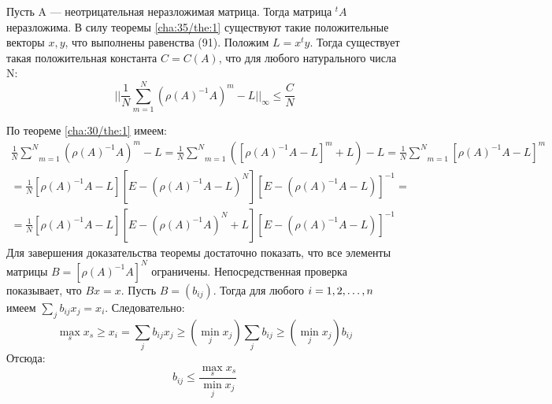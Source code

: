 \begin{theorem}[]\label{cha:36/the:1}
	Пусть A — неотрицательная неразложимая матрица. Тогда матрица $^tA$ неразложима. В силу теоремы \ref{cha:35/the:1} существуют такие положительные векторы $x,y$, что выполнены равенства (91). Положим $L = x^ty$. Тогда существует такая положительная константа $C = C(A)$, что для любого натурального числа N:
	$$\Big| \Big| \frac{1}{N} \underset{m=1}{\overset{N}{\sum}}\left( \rho(A)^{-1} A \right)^m - L \Big| \Big|_{\infty} \le \frac{C}{N}$$
\end{theorem}
\begin{Proof}
	По теореме \ref{cha:30/the:1} имеем:
	$$\begin{gathered}
		\frac{1}{N} \underset{m=1}{\overset{N}{\sum}}\left( \rho(A)^{-1} A \right)^m - L = \frac{1}{N} \underset{m=1}{\overset{N}{\sum}} \left( \left[ \rho(A)^{-1} A  - L \right]^m + L \right) - L = \frac{1}{N} \underset{m=1}{\overset{N}{\sum}} \left[ \rho(A)^{-1} A  - L \right]^m \\
		= \frac{1}{N}\left[ \rho(A)^{-1} A  - L \right]\left[ E - \left( \rho(A)^{-1} A  - L \right)^N \right]\left[ E - \left( \rho(A)^{-1} A  - L \right) \right]^{-1} = \\
		= \frac{1}{N}\left[ \rho(A)^{-1} A  - L \right]\left[ E - \left( \rho(A)^{-1} A \right)^N + L \right]\left[ E - \left( \rho(A)^{-1} A  - L \right) \right]^{-1}
	\end{gathered}$$
	Для завершения доказательства теоремы достаточно показать, что все элементы матрицы $B = \left[ \rho(A)^{−1}A\right]^N$ ограничены. Непосредственная проверка показывает, что $Bx = x$. Пусть $B = (b_{ij})$. Тогда для любого $i = 1,2,\dots,n$ имеем $\underset{j}{\overset{}{\sum}} b_{ij}x_j = x_i$. Следовательно:
	$$\underset{s}{\max}x_s \ge x_i = \underset{j}{\overset{}{\sum}}b_{ij} x_j \ge \left( \underset{j}{\min} x_j \right) \underset{j}{\overset{}{\sum}}b_{ij} \ge \left( \underset{j}{\min}x_j \right)b_{ij}$$
	Отсюда:
	$$b_{ij} \le \frac{\underset{s}{\max}x_s}{\underset{j}{\min}x_j}$$
\end{Proof}
















